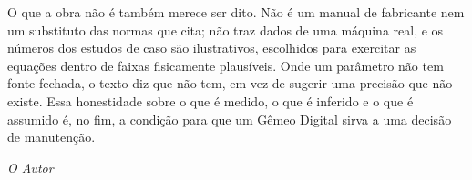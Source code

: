 O que a obra não é também merece ser dito. Não é um manual de fabricante nem
um substituto das normas que cita; não traz dados de uma máquina real, e os
números dos estudos de caso são ilustrativos, escolhidos para exercitar as
equações dentro de faixas fisicamente plausíveis. Onde um parâmetro não tem
fonte fechada, o texto diz que não tem, em vez de sugerir uma precisão que não
existe. Essa honestidade sobre o que é medido, o que é inferido e o que é
assumido é, no fim, a condição para que um Gêmeo Digital sirva a uma decisão de
manutenção.

\vspace{1em}
\hfill \textit{O Autor}

